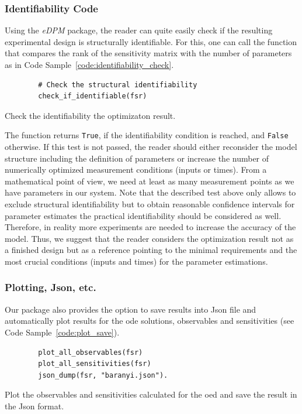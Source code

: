 \documentclass[graybox]{svmult}
\begin{document}
\subsubsection{Identifiability Code}
Using the {\it eDPM} package, the reader can quite easily check if the resulting experimental design is structurally identifiable.
For this, one can call the function that compares the rank of the sensitivity matrix with the number of parameters as in Code Sample~\ref{code:identifiability_check}.
\begin{code}[h]
    \begin{verbatim}
        # Check the structural identifiability
        check_if_identifiable(fsr)
    \end{verbatim}
\caption{Check the identifiability the optimizaton result.}
\label{code:identifiability_check}
\end{code}
The function returns \texttt{True}, if the identifiability condition is reached, and \texttt{False} otherwise.
If this test is not passed, the reader should either reconsider the model structure including the definition of parameters or increase the number of numerically optimized measurement conditions (inputs or times).
From a mathematical point of view, we need at least as many measurement points as we have parameters in our system.
Note that the described test above only allows to exclude structural identifiability but to obtain reasonable confidence intervals for parameter estimates the practical identifiability should be considered as well.
Therefore, in reality more experiments are needed to increase the accuracy of the model.
Thus, we suggest that the reader considers the optimization result not as a finished design but as a reference pointing to the minimal requirements and the most crucial conditions (inputs and times) for the parameter estimations.
%
\subsubsection{Plotting, Json, etc.}
Our package also provides the option to save results into Json file and automatically plot results for the ode solutions, observables and sensitivities (see Code Sample~\ref{code:plot_save}).
\begin{code}[h]
    \begin{verbatim}
        plot_all_observables(fsr)
        plot_all_sensitivities(fsr)
        json_dump(fsr, "baranyi.json").
    \end{verbatim}
\caption{Plot the observables and sensitivities calculated for the \ac{oed} and save the result in the Json format.}
\label{code:plot_save}
\end{code}
%
%
%
\end{document}
